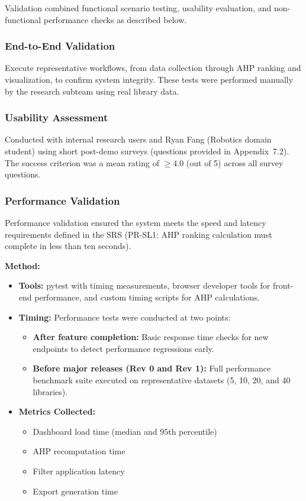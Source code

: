 \documentclass[12pt, titlepage]{article}
\begin{document}
Validation combined functional scenario testing, usability evaluation, and
non-functional performance checks as described below.

\subsubsection{End-to-End Validation}
Execute representative workflows, from data collection through AHP ranking and
visualization, to confirm system integrity. These tests were performed manually
by the research subteam using real library data.

\subsubsection{Usability Assessment}
Conducted with internal research users and Ryan Fang (Robotics domain student)
using short post-demo surveys (questions provided in Appendix~7.2). The success
criterion was a mean rating of $\geq 4.0$ (out of 5) across all survey questions.

\subsubsection{Performance Validation}
\label{subsubsec:performance-validation}

Performance validation ensured the system meets the speed and latency
requirements defined in the SRS (PR-SL1: AHP ranking calculation must complete
in less than ten seconds).

\textbf{Method:}
\begin{itemize}
  \item \textbf{Tools:} pytest with timing measurements, browser developer tools
  for front-end performance, and custom timing scripts for AHP calculations.

  \item \textbf{Timing:} Performance tests were conducted at two points:
  \begin{itemize}
    \item \textbf{After feature completion:} Basic response time checks for new
    endpoints to detect performance regressions early.
    \item \textbf{Before major releases (Rev 0 and Rev 1):} Full performance
    benchmark suite executed on representative datasets (5, 10, 20, and 40
    libraries).
  \end{itemize}

  \item \textbf{Metrics Collected:}
  \begin{itemize}
    \item Dashboard load time (median and 95th percentile)
    \item AHP recomputation time
    \item Filter application latency
    \item Export generation time
  \end{itemize}
\end{itemize}
\end{document}
